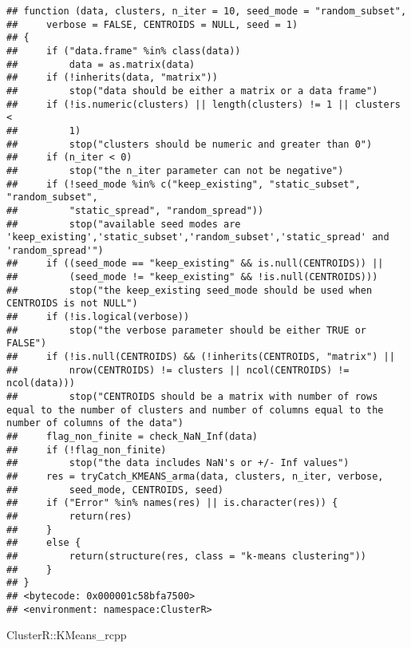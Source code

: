 \documentclass[
]{article}
\newenvironment{Shaded}{\begin{snugshade}}{\end{snugshade}}
\newcommand{\NormalTok}[1]{#1}
\newcommand{\SpecialCharTok}[1]{\textcolor[rgb]{0.00,0.00,0.00}{#1}}
\begin{document}
\begin{verbatim}
## function (data, clusters, n_iter = 10, seed_mode = "random_subset", 
##     verbose = FALSE, CENTROIDS = NULL, seed = 1) 
## {
##     if ("data.frame" %in% class(data)) 
##         data = as.matrix(data)
##     if (!inherits(data, "matrix")) 
##         stop("data should be either a matrix or a data frame")
##     if (!is.numeric(clusters) || length(clusters) != 1 || clusters < 
##         1) 
##         stop("clusters should be numeric and greater than 0")
##     if (n_iter < 0) 
##         stop("the n_iter parameter can not be negative")
##     if (!seed_mode %in% c("keep_existing", "static_subset", "random_subset", 
##         "static_spread", "random_spread")) 
##         stop("available seed modes are 'keep_existing','static_subset','random_subset','static_spread' and 'random_spread'")
##     if ((seed_mode == "keep_existing" && is.null(CENTROIDS)) || 
##         (seed_mode != "keep_existing" && !is.null(CENTROIDS))) 
##         stop("the keep_existing seed_mode should be used when CENTROIDS is not NULL")
##     if (!is.logical(verbose)) 
##         stop("the verbose parameter should be either TRUE or FALSE")
##     if (!is.null(CENTROIDS) && (!inherits(CENTROIDS, "matrix") || 
##         nrow(CENTROIDS) != clusters || ncol(CENTROIDS) != ncol(data))) 
##         stop("CENTROIDS should be a matrix with number of rows equal to the number of clusters and number of columns equal to the number of columns of the data")
##     flag_non_finite = check_NaN_Inf(data)
##     if (!flag_non_finite) 
##         stop("the data includes NaN's or +/- Inf values")
##     res = tryCatch_KMEANS_arma(data, clusters, n_iter, verbose, 
##         seed_mode, CENTROIDS, seed)
##     if ("Error" %in% names(res) || is.character(res)) {
##         return(res)
##     }
##     else {
##         return(structure(res, class = "k-means clustering"))
##     }
## }
## <bytecode: 0x000001c58bfa7500>
## <environment: namespace:ClusterR>
\end{verbatim}

\begin{Shaded}
\begin{Highlighting}[]
\NormalTok{ClusterR}\SpecialCharTok{::}\NormalTok{KMeans\_rcpp}
\end{Highlighting}
\end{Shaded}
\end{document}
